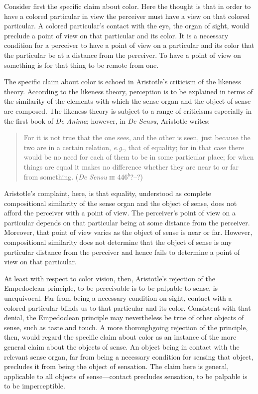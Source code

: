 Consider first the specific claim about color. Here the thought is that in order to have a colored particular in view the perceiver must have a view on that colored particular. A colored particular's contact with the eye, the organ of sight, would preclude a point of view on that particular and its color. It is a necessary condition for a perceiver to have a point of view on a particular and its color that the particular be at a distance from the perceiver. To have a point of view on something is for that thing to be remote from one. 

The specific claim about color is echoed in Aristotle's criticism of the likeness theory. According to the likeness theory, perception is to be explained in terms of the similarity of the elements with which the sense organ and the object of sense are composed. The likeness theory is subject to a range of criticisms especially in the first book of \emph{De Anima}; however, in \emph{De Sensu}, Aristotle writes:
\begin{quote}
	For it is not true that the one sees, and the other is seen, just because the two are in a certain relation, \emph{e.g.}, that of equality; for in that case there would be no need for each of them to be in some particular place; for when things are equal it makes no difference whether they are near to or far from something. (\emph{De Sensu} \textsc{iii} 446\( ^{b} \)?--?)
\end{quote} 
Aristotle's complaint, here, is that equality, understood as complete compositional similarity of the sense organ and the object of sense, does not afford the perceiver with a point of view. The perceiver's point of view on a particular depends on that particular being at some distance from the perceiver. Moreover, that point of view varies as the object of sense is near or far. However, compositional similarity does not determine that the object of sense is any particular distance from the perceiver and hence fails to determine a point of view on that particular.

At least with respect to color vision, then, Aristotle's rejection of the Empedoclean principle, to be perceivable is to be palpable to sense, is unequivocal. Far from being a necessary condition on sight, contact with a colored particular blinds us to that particular and its color. Consistent with that denial, the Empedoclean principle may nevertheless be true of other objects of sense, such as taste and touch. A more thoroughgoing rejection of the principle, then, would regard the specific claim about color as an instance of the more general claim about the objects of sense. An object being in contact with the relevant sense organ, far from being a necessary condition for sensing that object, precludes it from being the object of sensation. The claim here is general, applicable to all objects of sense---contact precludes sensation, to be palpable is to be imperceptible.

